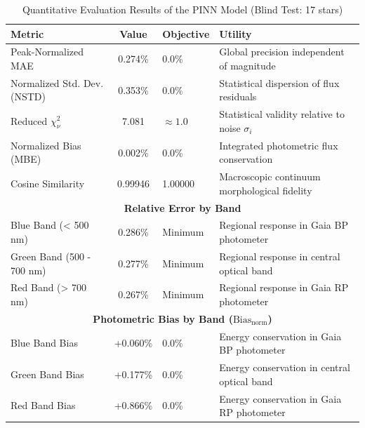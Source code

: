 
\begin{table}[htpb]
\centering
\caption{Quantitative Evaluation Results of the PINN Model (Blind Test: 17 stars)}
\label{tab:pinn_evaluation}
\begin{tabular}{lcll}
\hline
\textbf{Metric} & \textbf{Value} & \textbf{Objective} & \textbf{Utility} \\
\hline
Peak-Normalized MAE & 0.274\% & 0.0\% & Global precision independent of magnitude \\
Normalized Std. Dev. (NSTD) & 0.353\% & 0.0\% & Statistical dispersion of flux residuals \\
Reduced $\chi^2_\nu$ & 7.081 & $\approx 1.0$ & Statistical validity relative to noise $\sigma_i$ \\
Normalized Bias (MBE) & 0.002\% & 0.0\% & Integrated photometric flux conservation \\
Cosine Similarity & 0.99946 & 1.00000 & Macroscopic continuum morphological fidelity \\
\hline
\multicolumn{4}{c}{\textbf{Relative Error by Band}} \\
\hline
Blue Band (< 500 nm) & 0.286\% & Minimum & Regional response in Gaia BP photometer \\
Green Band (500 - 700 nm) & 0.277\% & Minimum & Regional response in central optical band \\
Red Band (> 700 nm) & 0.267\% & Minimum & Regional response in Gaia RP photometer \\
\hline
\multicolumn{4}{c}{\textbf{Photometric Bias by Band ($\text{Bias}_{\text{norm}}$)}} \\
\hline
Blue Band Bias & +0.060\% & 0.0\% & Energy conservation in Gaia BP photometer \\
Green Band Bias & +0.177\% & 0.0\% & Energy conservation in central optical band \\
Red Band Bias & +0.866\% & 0.0\% & Energy conservation in Gaia RP photometer \\
\hline
\end{tabular}
\end{table}
